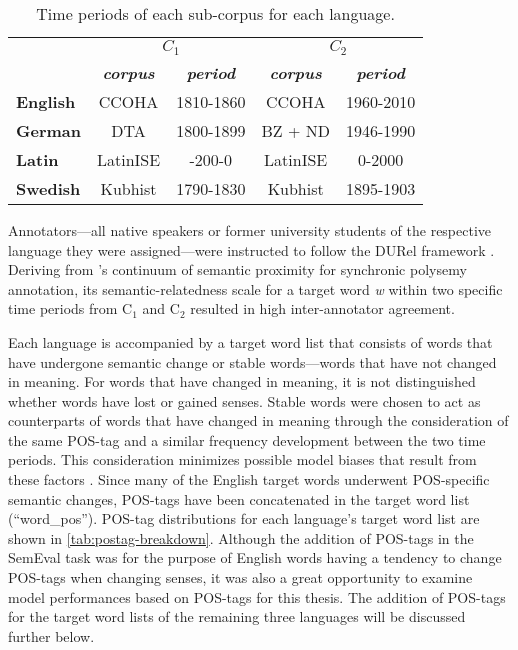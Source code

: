 \begin{table}[h]
\centering
\begin{tabular}{lcccc} 
\toprule
\textbf{}        & \multicolumn{2}{c}{\textbf{$C_1$}}                  & \multicolumn{2}{c}{\textbf{$C_2$}}                   \\
                 & \textit{\textbf{corpus}} & \textit{\textbf{period}} & \textit{\textbf{corpus}} & \textit{\textbf{period}}  \\ 
\cline{2-5}
\textbf{English} & CCOHA                    & 1810-1860                & CCOHA                    & 1960-2010                 \\
\textbf{German}  & DTA                      & 1800-1899                & BZ + ND                  & 1946-1990                 \\
\textbf{Latin}   & LatinISE                 & -200-0                   & LatinISE                 & 0-2000                    \\
\textbf{Swedish} & Kubhist                  & 1790-1830                & Kubhist                  & 1895-1903                 \\
\bottomrule
\end{tabular}
\caption{Time periods of each sub-corpus for each language.}
\label{tab:subcorpora-time}
\end{table}

Annotators—all native speakers or former university students of the respective language they were assigned—were instructed to follow the DURel framework \citep{DURel2018}. Deriving from \citet{blank1997prinzipien}’s continuum of semantic proximity for synchronic polysemy annotation, its semantic-relatedness scale for a target word \emph{w} within two specific time periods from C$_1$ and C$_2$ resulted in high inter-annotator agreement. 
	
Each language is accompanied by a target word list that consists of words that have undergone semantic change or stable words—words that have not changed in meaning. For words that have changed in meaning, it is not distinguished whether words have lost or gained senses. Stable words were chosen to act as counterparts of words that have changed in meaning through the consideration of the same POS-tag and a similar frequency development between the two time periods. This consideration minimizes possible model biases that result from these factors \citep{dubossarsky-etal-2017-outta}. Since many of the English target words underwent POS-specific semantic changes, POS-tags have been concatenated in the target word list (“word\_pos”). POS-tag distributions for each language's target word list are shown in \autoref{tab:postag-breakdown}. Although the addition of POS-tags in the SemEval task was for the purpose of English words having a tendency to change POS-tags when changing senses, it was also a great opportunity to examine model performances based on POS-tags for this thesis. The addition of POS-tags for the target word lists of the remaining three languages will be discussed further below.
 

